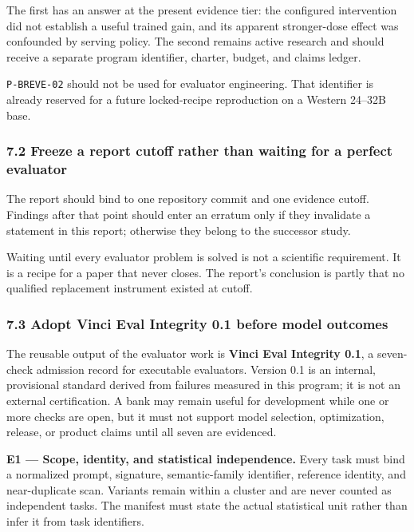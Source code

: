 \documentclass[
  9pt,
  letterpaper,
]{article}
\begin{document}
The first has an answer at the present evidence tier: the configured
intervention did not establish a useful trained gain, and its apparent
stronger-dose effect was confounded by serving policy. The second
remains active research and should receive a separate program
identifier, charter, budget, and claims ledger.

\texttt{P-BREVE-02} should not be used for evaluator engineering. That
identifier is already reserved for a future locked-recipe reproduction
on a Western 24--32B base.

\hypertarget{72-freeze-a-report-cutoff-rather-than-waiting-for-a-perfect-evaluator}{%
\subsubsection{7.2 Freeze a report cutoff rather than waiting for a
perfect
evaluator}\label{72-freeze-a-report-cutoff-rather-than-waiting-for-a-perfect-evaluator}}

The report should bind to one repository commit and one evidence cutoff.
Findings after that point should enter an erratum only if they
invalidate a statement in this report; otherwise they belong to the
successor study.

Waiting until every evaluator problem is solved is not a scientific
requirement. It is a recipe for a paper that never closes. The report's
conclusion is partly that no qualified replacement instrument existed at
cutoff.

\hypertarget{73-adopt-vinci-eval-integrity-01-before-model-outcomes}{%
\subsubsection{7.3 Adopt Vinci Eval Integrity 0.1 before model
outcomes}\label{73-adopt-vinci-eval-integrity-01-before-model-outcomes}}

The reusable output of the evaluator work is \textbf{Vinci Eval
Integrity 0.1}, a seven-check admission record for executable
evaluators. Version 0.1 is an internal, provisional standard derived
from failures measured in this program; it is not an external
certification. A bank may remain useful for development while one or
more checks are open, but it must not support model selection,
optimization, release, or product claims until all seven are evidenced.

\textbf{E1 --- Scope, identity, and statistical independence.} Every
task must bind a normalized prompt, signature, semantic-family
identifier, reference identity, and near-duplicate scan. Variants remain
within a cluster and are never counted as independent tasks. The
manifest must state the actual statistical unit rather than infer it
from task identifiers.
\end{document}
